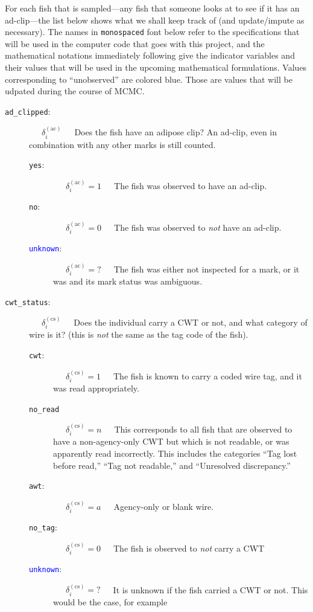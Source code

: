 \documentclass[11pt]{article}
\begin{document}
For each fish that is sampled---any fish that someone looks at to see if it has an ad-clip---the list below shows what we shall keep track of (and
update/impute as necessary).  The names in {\tt monospaced} font below refer to the specifications that
will be used in the computer code that goes with this project, and the mathematical notations immediately
following give
the indicator variables and their values that will be used in the upcoming mathematical formulations.
Values corresponding to ``unobserved''  
are colored blue. Those are values that will be udpated during the course of MCMC.
\begin{description}
	\item [{\tt ad\_clipped}:]  ~~~$\delta_i^{(\mathrm{ac})}$~~~Does the fish have an adipose clip? 	An ad-clip, even in combination with any other marks is still counted.
	\begin{description}
		\item [{\tt yes}:]  ~~~$\delta_i^{(\mathrm{ac})} = 1$~~~The fish was observed to have an ad-clip.
		\item [{\tt no}:]  ~~~$\delta_i^{(\mathrm{ac})} = 0$~~~The fish was observed to {\em not} have an ad-clip.
		\item [\textcolor{blue}{{\tt unknown}}:]  ~~~$\delta_i^{(\mathrm{ac})} = \mbox{?}$~~~The fish was either not
		inspected for a mark, or it was and its mark status was ambiguous.
	\end{description}
	\item [{\tt cwt\_status}:] ~~~$\delta_i^{(\mathrm{cs})}$~~~Does the individual carry a CWT or not, and what category of wire is
	it? (this is {\em not} the same as the tag code of the fish).
	\begin{description}
		\item [{\tt cwt}:] ~~~$\delta_i^{(\mathrm{cs})} = 1$~~~The fish is known to carry a coded wire tag, and it
		was read appropriately.
		\item [{\tt no\_read}] ~~~$\delta_i^{(\mathrm{cs})} = n$~~~This corresponds to all fish that
		are observed to have a non-agency-only CWT but which is not readable, or was apparently read incorrectly.  This 
		includes the categories ``Tag lost before read,'' ``Tag not readable,'' 
		and ``Unresolved discrepancy.''
		\item [{\tt awt}:] ~~~$\delta_i^{(\mathrm{cs})} = a$~~~Agency-only or blank wire.
		\item [{\tt no\_tag}:] ~~~$\delta_i^{(\mathrm{cs})} = 0$~~~The fish is observed to {\em not} carry a CWT
		\item [\textcolor{blue}{{\tt unknown}}:] ~~~$\delta_i^{(\mathrm{cs})} = \mbox{?}$~~~It is unknown if the fish carried a CWT or not.  This would be the case, for example

\end{description}
\end{description}
\end{document}
